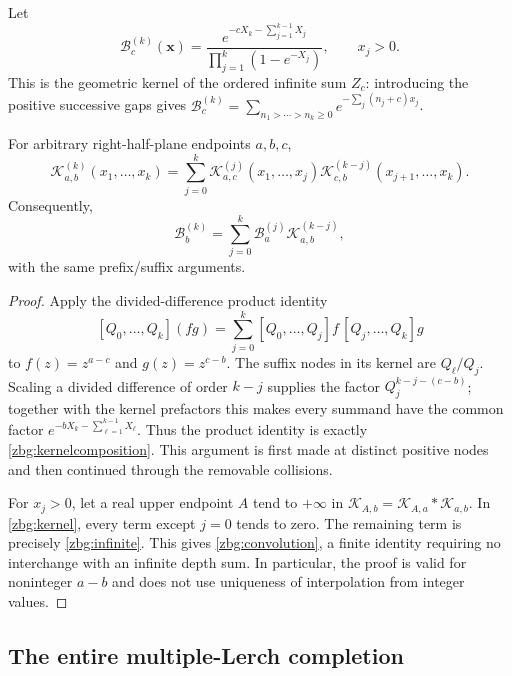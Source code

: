Let
\begin{equation}\label{zbg:infinite}
 \mathscr B_c^{(k)}(\boldsymbol x)
 =\frac{e^{-cX_k-\sum_{j=1}^{k-1}X_j}}
              {\prod_{j=1}^k(1-e^{-X_j})},\qquad x_j>0.
\end{equation}
This is the geometric kernel of the ordered infinite sum $Z_c$:
introducing the positive successive gaps gives
$\mathscr B_c^{(k)}=\sum_{n_1>\cdots>n_k\geq0}
e^{-\sum_j(n_j+c)x_j}$.

\begin{lemma}\label{zbg:composition}
For arbitrary right-half-plane endpoints $a,b,c$,
\begin{equation}\label{zbg:kernelcomposition}
 \mathscr K_{a,b}^{(k)}(x_1,\ldots,x_k)
 =\sum_{j=0}^k
   \mathscr K_{a,c}^{(j)}(x_1,\ldots,x_j)
   \mathscr K_{c,b}^{(k-j)}(x_{j+1},\ldots,x_k).
\end{equation}
Consequently,
\begin{equation}\label{zbg:convolution}
 \mathscr B_b^{(k)}=\sum_{j=0}^k
                       \mathscr B_a^{(j)}\mathscr K_{a,b}^{(k-j)},
\end{equation}
with the same prefix/suffix arguments.
\end{lemma}

\begin{proof}
Apply the divided-difference product identity
\[
 [Q_0,\ldots,Q_k](fg)=\sum_{j=0}^k
 [Q_0,\ldots,Q_j]f\,[Q_j,\ldots,Q_k]g
\]
to $f(z)=z^{a-c}$ and $g(z)=z^{c-b}$.  The suffix nodes in its
kernel are $Q_\ell/Q_j$.  Scaling a divided difference of order
$k-j$ supplies the factor $Q_j^{k-j-(c-b)}$; together with the
kernel prefactors this makes every summand have the common factor
$e^{-bX_k-\sum_{\ell=1}^{k-1}X_\ell}$.  Thus the product identity
is exactly \eqref{zbg:kernelcomposition}.  This argument is first
made at distinct positive nodes and then continued through the
removable collisions.

For $x_j>0$, let a real upper endpoint $A$ tend to $+\infty$ in
$\mathscr K_{A,b}=\mathscr K_{A,a}*\mathscr K_{a,b}$.  In
\eqref{zbg:kernel}, every term except $j=0$ tends to zero.  The
remaining term is precisely \eqref{zbg:infinite}.  This gives
\eqref{zbg:convolution}, a finite identity requiring no interchange
with an infinite depth sum.  In particular, the proof is valid for
noninteger $a-b$ and does not use uniqueness of interpolation from
integer values.
\end{proof}

\subsection{The entire multiple-Lerch completion}

